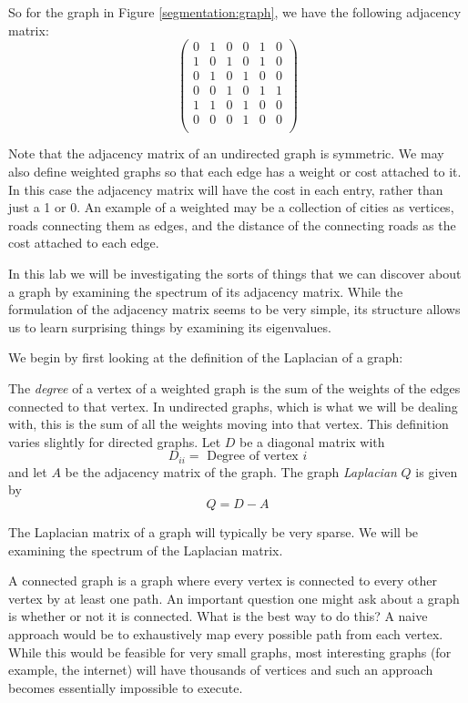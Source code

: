 So for the graph in Figure \ref{segmentation:graph}, we have the following adjacency matrix:
\[
\begin{pmatrix}
0 & 1 & 0 & 0 & 1 & 0 \\
1 & 0 & 1 & 0 & 1 & 0 \\
0 & 1 & 0 & 1 & 0 & 0 \\
0 & 0 & 1 & 0 & 1 & 1 \\
1 & 1 & 0 & 1 & 0 & 0 \\
0 & 0 & 0 & 1 & 0 & 0 \\
\end{pmatrix}
\]

Note that the adjacency matrix of an undirected graph is symmetric.
We may also define weighted graphs so that each edge has a weight or cost attached to it.
In this case the adjacency matrix will have the cost in each entry, rather than just a 1 or 0.
An example of a weighted may be a collection of cities as vertices, roads connecting them as edges, and the distance of the connecting roads as the cost attached to each edge.

In this lab we will be investigating the sorts of things that we can discover about a graph by examining the spectrum of its adjacency matrix.
While the formulation of the adjacency matrix seems to be very simple, its structure allows us to learn surprising things by examining its eigenvalues.

We begin by first looking at the definition of the Laplacian of a graph:

\begin{definition}  The \emph{degree} of a vertex of a weighted graph is the sum of the weights of the edges connected to that vertex.
In undirected graphs, which is what we will be dealing with, this is the sum of all the weights moving into that vertex.
This definition varies slightly for directed graphs.
Let $D$ be a diagonal matrix with
\[
D_{ii} = \mbox{ Degree of vertex $i$}
\]
and let $A$ be the adjacency matrix of the graph.
The graph \emph{Laplacian} $Q$ is given by
\[
Q = D-A
\]
\end{definition}

The Laplacian matrix of a graph will typically be very sparse.
We will be examining the spectrum of the Laplacian matrix.

A connected graph is a graph where every vertex is connected to every other vertex by at least one path.
An important question one might ask about a graph is whether or not it is connected.
What is the best way to do this?
A naive approach would be to exhaustively map every possible path from each vertex.
While this would be feasible for very small graphs, most interesting graphs (for example, the internet) will have thousands of vertices and such an approach becomes essentially impossible to execute.


